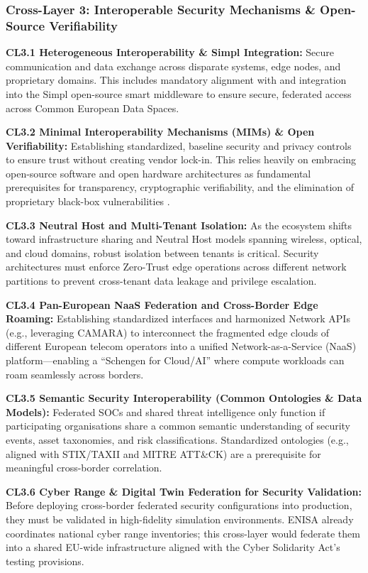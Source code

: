 \documentclass{ieeeaccess}
\begin{document}
\subsubsection*{Cross-Layer 3: Interoperable Security Mechanisms \& Open-Source Verifiability}
\textbf{CL3.1 Heterogeneous Interoperability \& Simpl Integration:} Secure communication and data exchange across disparate systems, edge nodes, and proprietary domains. This includes mandatory alignment with and integration into the Simpl open-source smart middleware \cite{cloud_edge_roadmap} to ensure secure, federated access across Common European Data Spaces.

\textbf{CL3.2 Minimal Interoperability Mechanisms (MIMs) \& Open Verifiability:} Establishing standardized, baseline security and privacy controls to ensure trust without creating vendor lock-in. This relies heavily on embracing open-source software and open hardware architectures as fundamental prerequisites for transparency, cryptographic verifiability, and the elimination of proprietary black-box vulnerabilities \cite{cloud_edge_roadmap}.

\textbf{CL3.3 Neutral Host and Multi-Tenant Isolation:} As the ecosystem shifts toward infrastructure sharing and Neutral Host models spanning wireless, optical, and cloud domains, robust isolation between tenants is critical. Security architectures must enforce Zero-Trust edge operations across different network partitions to prevent cross-tenant data leakage and privilege escalation.

\textbf{CL3.4 Pan-European NaaS Federation and Cross-Border Edge Roaming:} Establishing standardized interfaces and harmonized Network APIs (e.g., leveraging CAMARA) to interconnect the fragmented edge clouds of different European telecom operators into a unified Network-as-a-Service (NaaS) platform---enabling a ``Schengen for Cloud/AI'' where compute workloads can roam seamlessly across borders.

\textbf{CL3.5 Semantic Security Interoperability (Common Ontologies \& Data Models):} Federated SOCs and shared threat intelligence only function if participating organisations share a common semantic understanding of security events, asset taxonomies, and risk classifications. Standardized ontologies (e.g., aligned with STIX/TAXII and MITRE ATT\&CK) are a prerequisite for meaningful cross-border correlation.

\textbf{CL3.6 Cyber Range \& Digital Twin Federation for Security Validation:} Before deploying cross-border federated security configurations into production, they must be validated in high-fidelity simulation environments. ENISA already coordinates national cyber range inventories; this cross-layer would federate them into a shared EU-wide infrastructure aligned with the Cyber Solidarity Act's testing provisions.
\end{document}

